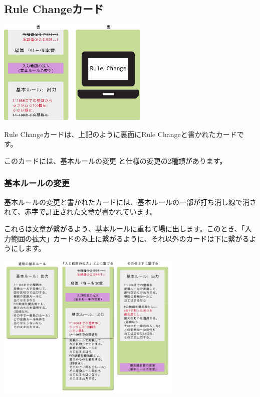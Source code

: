 \documentclass[index]{subfiles}
\begin{document}
  \subsection{Rule Changeカード}
  \label{subsec:rule_change_card}

\begin{center}
  \includegraphics[height=5cm]{image/105_rule_change_card.png}
\end{center}

{\sf Rule Changeカード}は、上記のように裏面にRule Changeと書かれたカードです。

このカードには、{\sf 基本ルールの変更} と{\sf 仕様の変更}の2種類があります。

  \subsubsection{基本ルールの変更}

{\sf 基本ルールの変更}と書かれたカードには、基本ルールの一部が打ち消し線で消されて、赤字で訂正された文章が書かれています。

これらは文章が繋がるよう、基本ルールに重ねて場に出します。このとき、「入力範囲の拡大」カードのみ上に繋がるように、それ以外のカードは下に繋がるようにします。

\begin{center}
  \includegraphics[height=7cm]{image/106_rule_change_apply.png}
\end{center}
\end{document}
